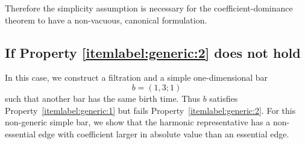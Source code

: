 \documentclass[11pt]{amsart}
\theoremstyle{theorem}
\theoremstyle{remark}
\theoremstyle{definition}
\newcommand{\hide}[1]{}
\begin{document}
\hide{
\subsubsection{Conclusion}

Removing Property (A) has two consequences.

First, the coefficient-dominance theorem is no longer literally well-defined
as stated, because the harmonic object attached to a multiplicity-\(m\) bar is
an \(m\)-dimensional subspace, not a harmonic line.

Second, under the natural extension of the representative-set definition, if
\[
m>1,
\]
then
\[
\Sigma(b)=\varnothing.
\]
Thus the coefficient-dominance statement becomes vacuous.

Finally, if one instead chooses an arbitrary nonzero harmonic representative
inside the higher-dimensional harmonic bar subspace and defines essential
simplices relative to that choice, coefficient dominance can fail. The explicit
example above gives a bar
\[
b=(1,\infty,2)
\]
satisfying the analogue of Property (B) but not Property (A), and a chosen
harmonic vector
\[
h=h_1+\varepsilon h_2
\]
for which the essential edge
\[
\sigma=[04]
\]
has coefficient magnitude
\[
\varepsilon,
\]
while the non-essential edge
\[
\tau=[01]
\]
has coefficient magnitude
\[
2.
\]
For \(0<\varepsilon<2\),
\[
|\langle h,\tau\rangle|>|\langle h,\sigma\rangle|.
\]
}
Therefore the simplicity assumption is necessary for the coefficient-dominance
theorem to have a non-vacuous, canonical formulation.



\subsection{If Property \eqref{itemlabel:generic:2} does not hold}
In this case, 
we construct a filtration and a simple one-dimensional bar
\[
b=(1,3;1)
\]
such that another bar has the same birth time. Thus \(b\) satisfies 
Property~\eqref{itemlabel:generic:1} but fails Property~\eqref{itemlabel:generic:2}.
For this non-generic simple bar, we show that the harmonic representative
has a non-essential edge with coefficient larger in absolute value than an
essential edge.


\end{document}
